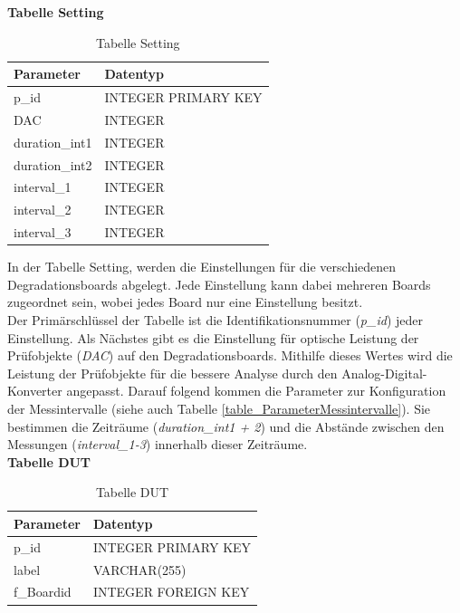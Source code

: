 \newpage

\textbf{Tabelle Setting}\\

\begin{table}[H]
\begin{center}
\begin{tabular}{|l|l|}\hline
Parameter & Datentyp \\ \hline
p\_id & INTEGER PRIMARY KEY\\ 
DAC & INTEGER\\ 
duration\_int1 & INTEGER\\ 
duration\_int2 & INTEGER\\ 
interval\_1 & INTEGER\\ 
interval\_2 & INTEGER\\ 
interval\_3 & INTEGER\\ \hline
\end{tabular}
\caption{Tabelle Setting}
\label{table_TabelleSetting}
\end{center}
\end{table}

In der Tabelle Setting, werden die Einstellungen  für die verschiedenen Degradationsboards abgelegt. Jede Einstellung kann dabei mehreren Boards zugeordnet sein, wobei jedes Board nur eine Einstellung besitzt.\\
Der Primärschlüssel der Tabelle ist die Identifikationsnummer (\textit{p\_id}) jeder Einstellung. Als Nächstes gibt es die Einstellung für optische Leistung der Prüfobjekte (\textit{DAC}) auf den Degradationsboards. Mithilfe dieses Wertes wird die Leistung der Prüfobjekte für die bessere Analyse durch den Analog-Digital-Konverter angepasst. Darauf folgend kommen die Parameter zur Konfiguration der Messintervalle (siehe auch Tabelle \ref{table_ParameterMessintervalle}). Sie bestimmen die Zeiträume (\textit{duration\_int1 + 2}) und die Abstände zwischen den Messungen (\textit{interval\_1-3}) innerhalb dieser Zeiträume.\\

\textbf{Tabelle DUT}\\

\begin{table}[H]
\begin{center}
\begin{tabular}{|l|l|}\hline
Parameter & Datentyp \\ \hline
p\_id & INTEGER PRIMARY KEY\\ 
label & VARCHAR(255)\\ 
f\_Boardid & INTEGER FOREIGN KEY\\ \hline
\end{tabular}
\caption{Tabelle DUT}
\label{table_TabelleDUT}
\end{center}
\end{table}

